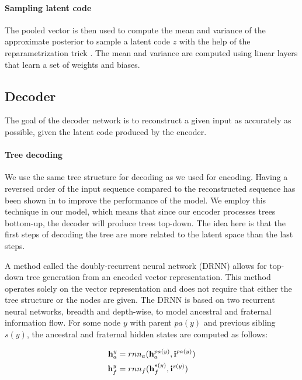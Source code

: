 \paragraph{Sampling latent code} The pooled vector is then used to compute the mean and variance of the approximate posterior to sample a latent code $z$ with the help of the reparametrization trick \cite{kingma2013auto}. The mean and variance are computed using linear layers that learn a set of weights and biases. 


\newpage
\subsection{Decoder}
The goal of the decoder network is to reconstruct a given input as accurately as possible, given the latent code produced by the encoder. 

\paragraph{Tree decoding} We use the same tree structure for decoding as we used for encoding. 
Having a reversed order of the input sequence compared to the reconstructed sequence has been shown in \cite{fabius2015variational} to improve the performance of the model. 
We employ this technique in our model, which means that since our encoder processes trees bottom-up, the decoder will produce trees top-down. 
The idea here is that the first steps of decoding the tree are more related to the latent space than the last steps.



A method called the doubly-recurrent neural network (DRNN) \cite{alvarezmelis2017tree} allows for top-down tree generation from an encoded vector representation. This method operates solely on the vector representation and does not require that either the tree structure or the nodes are given. The DRNN is based on two recurrent neural networks, breadth and depth-wise, to model ancestral and fraternal information flow. For some node $y$ with parent $pa(y)$ and previous sibling $s(y)$, the ancestral and fraternal hidden states are computed as follows:

\begin{align}
    \mathbf{h}_a^y &= rnn_a(\mathbf{h}_a^{pa(y)}, \mathbf{i}^{pa(y)}) \\ \label{eq:ancestral_update}
    \mathbf{h}_f^y &= rnn_f(\mathbf{h}_f^{s(y)}, \mathbf{i}^{s(y)}) 
\end{align}

